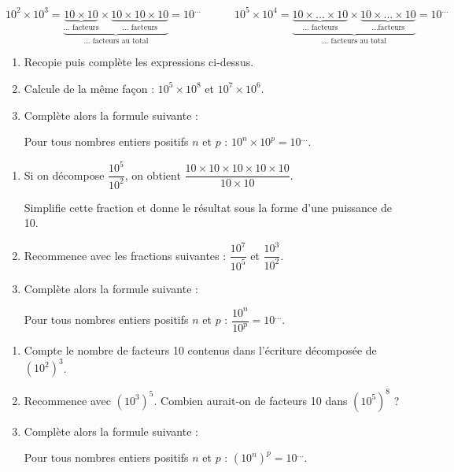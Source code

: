 \begin{activite}

\begin{partie}

\[ 10^2 \times 10^3 = \underbrace{\underbrace{10 \times 10}_{\text{... facteurs}} \times \underbrace{10 \times 10 \times 10}_{\text{... facteurs}}}_{\text{... facteurs au total}} = 10^{...}  \qquad \quad 10^5 \times 10^4 = \underbrace{\underbrace{10 \times ... \times 10}_{\text{... facteurs}} \times \underbrace{10 \times ... \times 10}_{\text{...facteurs}}}_{\text{... facteurs au total}} = 10^{...}  \]
      
\begin{enumerate}
\item Recopie puis complète les expressions ci-dessus.
\item Calcule de la même façon : $10^5 \times 10^8$ et $10^7 \times 10^6$.
\item Complète alors la formule suivante : 

Pour tous nombres entiers positifs $n$ et $p$ : $10^n \times 10^p = 10^{...}$.

\end{enumerate}
\end{partie}

\begin{partie}
\begin{enumerate}
\item Si on décompose $\dfrac{10^5}{10^2}$, on obtient $\dfrac{10 \times 10 \times 10 \times 10 \times 10}{10 \times 10}$.

Simplifie cette fraction et donne le résultat sous la forme d'une puissance de 10.
\item Recommence avec les fractions suivantes : $\dfrac{10^7}{10^5}$ et $\dfrac{10^3}{10^2}$.
\item Complète alors la formule suivante :

Pour tous nombres entiers positifs $n$ et $p$ : $\dfrac{10^n}{10^p}=10^{...}$.
\end{enumerate}
\end{partie}

\begin{partie}

\begin{enumerate}
\item Compte le nombre de facteurs 10 contenus dans l'écriture décomposée de $(10^2)^3$.
\item Recommence avec $(10^3)^5$. Combien aurait-on de facteurs 10 dans $(10^5)^8$ ?
\item Complète alors la formule suivante : 

Pour tous nombres entiers positifs $n$ et $p$ : $(10^n)^p=10^{...}$.
\end{enumerate}
\end{partie}
\end{activite}

